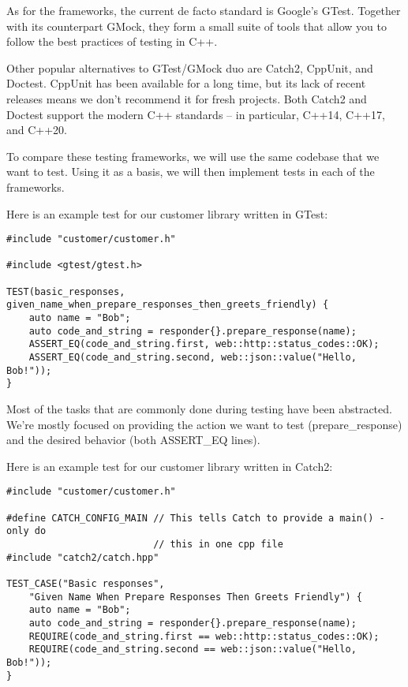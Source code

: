 
As for the frameworks, the current de facto standard is Google's GTest. Together with its counterpart GMock, they form a small suite of tools that allow you to follow the best practices of testing in C++.

Other popular alternatives to GTest/GMock duo are Catch2, CppUnit, and Doctest. CppUnit has been available for a long time, but its lack of recent releases means we don't recommend it for fresh projects. Both Catch2 and Doctest support the modern C++ standards – in particular, C++14, C++17, and C++20.

To compare these testing frameworks, we will use the same codebase that we want to test. Using it as a basis, we will then implement tests in each of the frameworks.


Here is an example test for our customer library written in GTest:

\begin{lstlisting}[style=styleCXX]
#include "customer/customer.h"

#include <gtest/gtest.h>

TEST(basic_responses,
given_name_when_prepare_responses_then_greets_friendly) {
	auto name = "Bob";
	auto code_and_string = responder{}.prepare_response(name);
	ASSERT_EQ(code_and_string.first, web::http::status_codes::OK);
	ASSERT_EQ(code_and_string.second, web::json::value("Hello, Bob!"));
}
\end{lstlisting}

Most of the tasks that are commonly done during testing have been abstracted. We're mostly focused on providing the action we want to test (prepare\_response) and the desired behavior (both ASSERT\_EQ lines).


Here is an example test for our customer library written in Catch2:

\begin{lstlisting}[style=styleCXX]
#include "customer/customer.h"

#define CATCH_CONFIG_MAIN // This tells Catch to provide a main() - only do
						  // this in one cpp file
#include "catch2/catch.hpp"

TEST_CASE("Basic responses",
	"Given Name When Prepare Responses Then Greets Friendly") {
	auto name = "Bob";
	auto code_and_string = responder{}.prepare_response(name);
	REQUIRE(code_and_string.first == web::http::status_codes::OK);
	REQUIRE(code_and_string.second == web::json::value("Hello, Bob!"));
}
\end{lstlisting}

